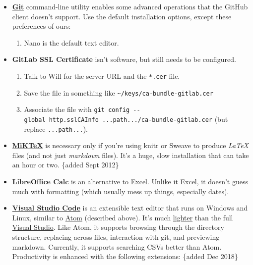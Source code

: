 \documentclass[]{book}
\providecommand{\tightlist}{%
  \setlength{\itemsep}{0pt}\setlength{\parskip}{0pt}}
\begin{document}
\begin{itemize}
\item
  \textbf{\href{https://git-scm.com/downloads}{Git}} command-line utility enables some advanced operations that the GitHub client doesn't support. Use the default installation options, except these preferences of ours:

  \begin{enumerate}
  \def\labelenumi{\arabic{enumi}.}
  \tightlist
  \item
    Nano is the default text editor.
  \end{enumerate}
\item
  \textbf{GitLab SSL Certificate} isn't software, but still needs to be configured.

  \begin{enumerate}
  \def\labelenumi{\arabic{enumi}.}
  \tightlist
  \item
    Talk to Will for the server URL and the \texttt{*.cer} file.
  \item
    Save the file in something like \texttt{\textasciitilde{}/keys/ca-bundle-gitlab.cer}
  \item
    Associate the file with \texttt{git\ config\ -\/-global\ http.sslCAInfo\ ...path.../ca-bundle-gitlab.cer} (but replace \texttt{...path...}).
  \end{enumerate}
\item
  \textbf{\href{http://miktex.org/}{MiKTeX}} is necessary only if you're using knitr or Sweave to produce \emph{LaTeX} files (and not just \emph{markdown} files). It's a huge, slow installation that can take an hour or two. \{added Sept 2012\}
\item
  \textbf{\href{https://www.libreoffice.org/discover/calc/}{LibreOffice Calc}} is an alternative to Excel. Unlike it Excel, it doesn't guess much with formatting (which usually mess up things, especially dates).
\item
  \textbf{\href{https://code.visualstudio.com/}{Visual Studio Code}} is an extensible text editor that runs on Windows and Linux, similar to \href{https://atom.io/}{Atom} (described above). It's much \href{https://stackoverflow.com/questions/30527522/what-are-the-differences-between-visual-studio-code-and-visual-studio}{lighter} than the full \href{https://visualstudio.microsoft.com/}{Visual Studio}. Like Atom, it supports browsing through the directory structure, replacing across files, interaction with git, and previewing markdown. Currently, it supports searching CSVs better than Atom. Productivity is enhanced with the following extensions: \{added Dec 2018\}


\end{itemize}
\end{document}
